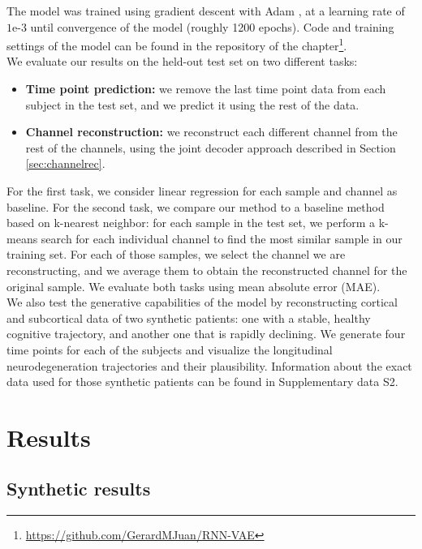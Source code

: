The model was trained using gradient descent with Adam \cite{Kingma2015a}, at a learning rate of $1\text{e-}3$ until convergence of the model (roughly 1200 epochs). Code and training settings of the model can be found in the repository of the chapter\footnote{\url{https://github.com/GerardMJuan/RNN-VAE}}. \\

We evaluate our results on the held-out test set on two different tasks: 

\begin{itemize}
    \item \textbf{Time point prediction:} we remove the last time point data from each subject in the test set, and we predict it using the rest of the data. 
    \item \textbf{Channel reconstruction:} we reconstruct each different channel from the rest of the channels, using the joint decoder approach described in Section \ref{sec:channelrec}.
\end{itemize}

For the first task, we consider linear regression for each sample and channel as baseline. For the second task, we compare our method to a baseline method based on k-nearest neighbor: for each sample in the test set, we perform a k-means search for each individual channel to find the most similar sample in our training set. For each of those samples, we select the channel we are reconstructing, and we average them to obtain the reconstructed channel for the original sample. We evaluate both tasks using mean absolute error (MAE). \\

We also test the generative capabilities of the model by reconstructing cortical and subcortical data of two synthetic patients: one with a stable, healthy cognitive trajectory, and another one that is rapidly declining. We generate four time points for each of the subjects and visualize the longitudinal neurodegeneration trajectories and their plausibility. Information about the exact data used for those synthetic patients can be found in Supplementary data S2. \\

\section{Results}
\label{rnn:results}

\subsection{Synthetic results}

